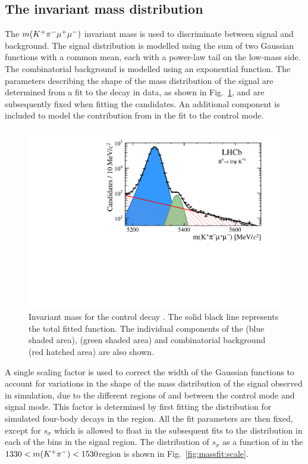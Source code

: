 \subsection{The \mkpimm invariant mass distribution}
\label{sec:kpimm:massfit}

The $m({{K}^+}{{\pi}^-}{\mu^+\mu^-})$ invariant mass is used to discriminate between signal and background. The signal distribution is modelled using the sum of two Gaussian functions with a common mean, each with a power-law tail on the low-mass side.  The combinatorial background is modelled using an exponential function.  The parameters describing the shape of the mass distribution of the signal are determined from a fit to the \BdToJPsiKstP decay in data, as shown in Fig.~\ref{fig:massfit:jpsi}, and are subsequently fixed when fitting the \BdToKpimm candidates. An additional component is included to model the contribution from \BsToJPsiKst in the fit to the control mode. 

\begin{figure}[!tb]
\centering
\includegraphics[width=0.7\linewidth]{figs/kpimm/massfit/fit_jpsi_log.pdf}
\caption{Invariant mass \mkpimm for the control decay \BdToJPsiKst. The solid black line represents the total fitted function.  The individual components of the \BdToJPsiKst (blue shaded area), \BsToJPsiKst (green shaded area) and combinatorial background (red hatched area) are also shown.}
\label{fig:massfit:jpsi}
\end{figure}

A single scaling factor is used to correct the width of the Gaussian functions to account for variations in the shape of the mass distribution of the signal observed in simulation, due to the different regions of \mkpi and \qsq between the control mode and signal mode. This factor is determined by first fitting the \mkpimm distribution for simulated four-body \BdToKpimm decays in the \BdToJPsiKstP region.  All the fit parameters are then fixed, except for $s_{\sigma}$ which is allowed to float in the subsequent fits to the \mkpimm distribution in each of the \qsq bins in the \BdToKpimm signal region. The distribution of $s_{\sigma}$ as a function of \qsq in the $1330<m({{K}^+}{{\pi}^-})<1530$\mevcc region is shown in Fig.~\ref{fig:massfit:scale}.  %

